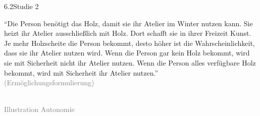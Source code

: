 \documentclass[xcolor=table,9pt,aspectratio=169]{beamer}
\begin{document}
\begin{frame}{\vspace*{10mm}6.2\hspace*{1em}Studie 2}
\begin{multicols}{2}
   \enquote{Die Person benötigt das Holz, damit sie ihr Atelier im Winter nutzen kann. Sie heizt ihr Atelier ausschließlich mit Holz. Dort schafft sie in ihrer Freizeit Kunst. Je mehr Holzscheite die Person bekommt, desto höher ist die Wahrscheinlichkeit, dass sie ihr Atelier nutzen wird. Wenn die Person gar kein Holz bekommt, wird sie mit Sicherheit nicht ihr Atelier nutzen. Wenn die Person alles verfügbare Holz bekommt, wird mit Sicherheit ihr Atelier nutzen.}\\
   \medskip
   \textcolor{gray}{(Ermöglichungsformulierung)}
   \vfill
   \begin{center}
      \\
      \footnotesize{\textcolor{gray}{Illustration Autonomie}}
   \end{center}
\end{multicols}
\end{frame}
\end{document}
